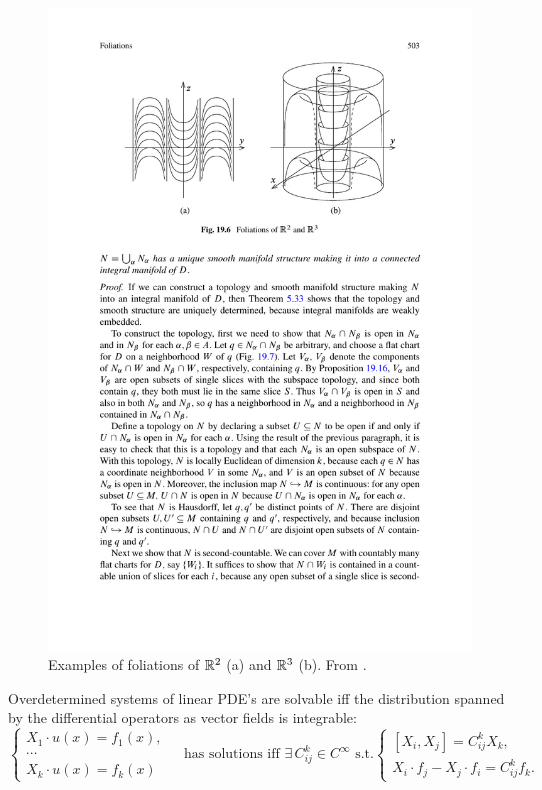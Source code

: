 \begin{figure}
    \centering
    \includegraphics[scale=0.8]{figures/foliations.pdf}
    \caption{Examples of foliations of $\mathbb{R}^2$ (a) and $\mathbb{R}^3$ (b). From \cite{Lee}.}
    \label{fig:foliations}
\end{figure}

\begin{example}
    Overdetermined systems of linear PDE's are solvable iff the distribution spanned by the differential operators as vector fields is integrable:
    \[\begin{cases}
        X_1\cdot u(x)=f_1(x),&\\
        \cdots &\\
        X_k\cdot u(x)=f_k(x)&
    \end{cases}
    \text{ has solutions iff }\exists\,C^k_{ij}\in C^\infty\text{ s.t.}
    \begin{cases}
        [X_i,X_j]=C^k_{ij}X_k,&\\
        X_i\cdot f_j-X_j\cdot f_i=C^k_{ij}f_k.&
    \end{cases}
    \]
\end{example}

